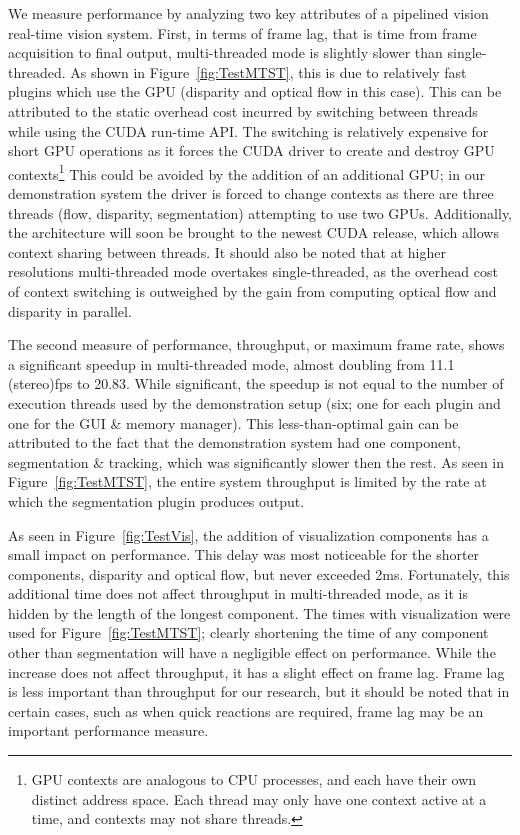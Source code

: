 We measure performance by analyzing two key attributes of a pipelined vision real-time vision system. First, in terms of frame lag, that is time from frame acquisition to final output, multi-threaded mode is slightly slower than single-threaded. As shown in Figure~\ref{fig:TestMTST}, this is due to relatively fast plugins which use the GPU (disparity and optical flow in this case). This can be attributed to the static overhead cost incurred by switching between threads while using the CUDA run-time API. The switching is relatively expensive for short GPU operations as it forces the CUDA driver to create and destroy GPU contexts\footnote{GPU contexts are analogous to CPU processes, and each have their own distinct address space. Each thread may only have one context active at a time, and contexts may not share threads.} This could be avoided by the addition of an additional GPU; in our demonstration system the driver is forced to change contexts as there 
are three threads (flow, disparity, segmentation) attempting to use two GPUs. Additionally, the architecture will soon be brought to the newest CUDA release, which allows context sharing between threads. It should also be noted that at higher resolutions multi-threaded mode overtakes single-threaded, as the overhead cost of context switching is outweighed by the gain from computing optical flow and disparity in parallel. 

The second measure of performance, throughput, or maximum frame rate, shows a significant speedup in multi-threaded mode, almost doubling from 11.1 (stereo)fps to 20.83. While significant, the speedup is not equal to the number of execution threads used by the demonstration setup (six; one for each plugin and one for the GUI \& memory manager). This less-than-optimal gain can be attributed to the fact that the demonstration system had one component, segmentation \& tracking, which was significantly slower then the rest. As seen in Figure~\ref{fig:TestMTST}, the entire system throughput is limited by the rate at which the segmentation plugin produces output. 

As seen in Figure~\ref{fig:TestVis}, the addition of visualization components has a small impact on performance. This delay was most noticeable for the shorter components, disparity and optical flow, but never exceeded 2ms. Fortunately, this additional time does not affect throughput in multi-threaded mode, as it is hidden by the length of the longest component. The times with visualization were used for Figure~\ref{fig:TestMTST}; clearly shortening the time of any component other than segmentation will have a negligible effect on performance. While the increase does not affect throughput, it has a slight effect on frame lag. Frame lag is less important than throughput for our research, but it should be noted that in certain cases, such as when quick reactions are required, frame lag may be an important performance measure. 

